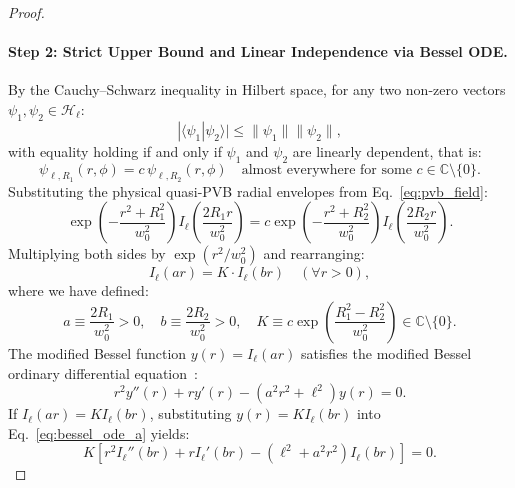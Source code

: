 \documentclass[11pt,a4paper]{article}
\begin{document}
\begin{proof}
\paragraph{Step 2: Strict Upper Bound and Linear Independence via Bessel ODE.}
By the Cauchy--Schwarz inequality in Hilbert space, for any two non-zero vectors $\psi_1, \psi_2 \in \mathcal{H}_\ell$:
\begin{equation}
|\langle \psi_1 | \psi_2 \rangle| \le \|\psi_1\| \|\psi_2\|,
\label{eq:cauchy_schwarz}
\end{equation}
with equality holding if and only if $\psi_1$ and $\psi_2$ are linearly dependent, that is:
\begin{equation}
\psi_{\ell, R_1}(r, \phi) = c \, \psi_{\ell, R_2}(r, \phi) \quad \text{almost everywhere for some } c \in \mathbb{C} \setminus \{0\}.
\label{eq:linear_dependence_hypothesis}
\end{equation}
Substituting the physical quasi-PVB radial envelopes from Eq.~\eqref{eq:pvb_field}:
\begin{equation}
\exp\left( - \frac{r^2 + R_1^2}{w_0^2} \right) I_\ell\left( \frac{2 R_1 r}{w_0^2} \right) = c \exp\left( - \frac{r^2 + R_2^2}{w_0^2} \right) I_\ell\left( \frac{2 R_2 r}{w_0^2} \right).
\label{eq:linear_dependence_step1}
\end{equation}
Multiplying both sides by $\exp(r^2 / w_0^2)$ and rearranging:
\begin{equation}
I_\ell(a r) = K \cdot I_\ell(b r) \quad (\forall r > 0),
\label{eq:linear_dependence_step2}
\end{equation}
where we have defined:
\begin{equation}
a \equiv \frac{2 R_1}{w_0^2} > 0, \quad b \equiv \frac{2 R_2}{w_0^2} > 0, \quad K \equiv c \exp\left( \frac{R_1^2 - R_2^2}{w_0^2} \right) \in \mathbb{C} \setminus \{0\}.
\label{eq:ode_constants}
\end{equation}
The modified Bessel function $y(r) = I_\ell(a r)$ satisfies the modified Bessel ordinary differential equation~\cite{Arfken2012}:
\begin{equation}
r^2 y''(r) + r y'(r) - (a^2 r^2 + \ell^2) y(r) = 0.
\label{eq:bessel_ode_a}
\end{equation}
If $I_\ell(a r) = K I_\ell(b r)$, substituting $y(r) = K I_\ell(b r)$ into Eq.~\eqref{eq:bessel_ode_a} yields:
\begin{equation}
K \left[ r^2 I_\ell''(b r) + r I_\ell'(b r) - (\ell^2 + a^2 r^2) I_\ell(b r) \right] = 0.
\label{eq:bessel_ode_substitution}
\end{equation}

\end{proof}
\end{document}
